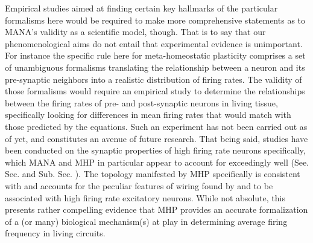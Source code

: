 \documentclass[10pt,letterpaper]{article}
\begin{document}
Empirical studies aimed at finding certain key hallmarks of the particular formalisms here would be required to make more comprehensive statements as to MANA's validity as a scientific model, though. That is to say that our phenomenological aims do not entail that experimental evidence is unimportant. For instance the specific rule here for meta-homeostatic plasticity comprises a set of unambiguous formalisms translating the relationship between a neuron and its pre-synaptic neighbors into a realistic distribution of firing rates. The validity of those formalisms would require an empirical study to determine the relationships between the firing rates of pre- and post-synaptic neurons in living tissue, specifically looking for differences in mean firing rates that would match with those predicted by the equations. Such an experiment has not been carried out as of yet, and constitutes an avenue of future research. That being said, studies have been conducted on the synaptic properties of high firing rate neurons specifically, which MANA and MHP in particular appear to account for exceedingly well (See. Sec.  and Sub. Sec. ).  The topology manifested by MHP specifically is consistent with and accounts for the peculiar features of wiring found by \cite{yassin2010embedded} and \cite{benedetti2012differential}  to be associated with high firing rate excitatory neurons.  While not absolute, this presents rather compelling evidence that MHP provides an accurate formalization of a (or many) biological mechanism(s) at play in determining average firing frequency in living circuits. 
\end{document}
